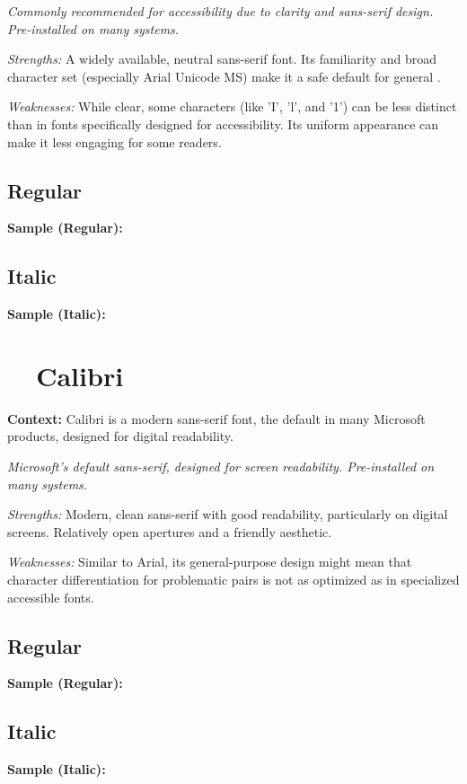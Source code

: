 \emph{Commonly recommended for accessibility due to clarity and sans-serif design. Pre-installed on many systems.}
\begin{raggedright}
	\emph{Strengths:} A widely available, neutral sans-serif font. Its familiarity and broad character set (especially Arial Unicode MS) make it a safe default for general .

	\emph{Weaknesses:} While clear, some characters (like 'I', 'l', and '1') can be less distinct than in fonts specifically designed for accessibility. Its uniform appearance can make it less engaging for some readers.

	\subsection{Regular}
	\noindent\textbf{Sample (Regular):}
	\FontSample{\arialfont}

	\subsection{Italic}
	\noindent\textbf{Sample (Italic):}
	\FontSample{{\arialfont\itshape}}
\end{raggedright}


\pagebreak
\section{~~Calibri}\label{app5:sec:calibri}
\noindent
\textbf{Context:} Calibri is a modern sans-serif font, the default in many Microsoft products, designed for digital readability.

\emph{Microsoft’s default sans-serif, designed for screen readability. Pre-installed on many systems.}
\begin{raggedright}
	\emph{Strengths:} Modern, clean sans-serif with good readability, particularly on digital screens. Relatively open apertures and a friendly aesthetic.

	\emph{Weaknesses:} Similar to Arial, its general-purpose design might mean that character differentiation for problematic pairs is not as optimized as in specialized accessible fonts.

	\subsection{Regular}
	\noindent\textbf{Sample (Regular):}
	\FontSample{\calibrifont}

	\subsection{Italic}
	\noindent\textbf{Sample (Italic):}
	\FontSample{{\calibrifont\itshape}}
\end{raggedright}


